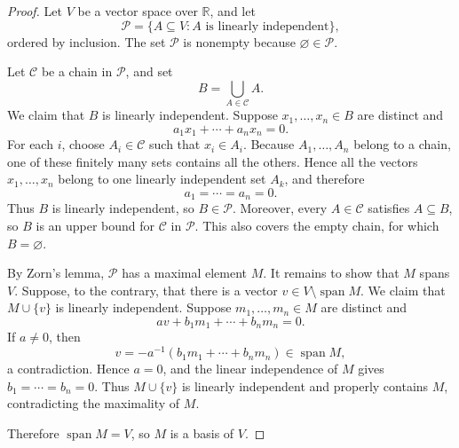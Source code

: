 \begin{proof}
Let $V$ be a vector space over $\mathbb{R}$, and let
\[
\mathcal{P}=\{A\subseteq V:A\text{ is linearly independent}\},
\]
ordered by inclusion. The set $\mathcal{P}$ is nonempty because
$\varnothing\in\mathcal{P}$.

Let $\mathcal{C}$ be a chain in $\mathcal{P}$, and set
\[
B=\bigcup_{A\in\mathcal{C}}A.
\]
We claim that $B$ is linearly independent. Suppose
$x_1,\ldots,x_n\in B$ are distinct and
\[
a_1x_1+\cdots+a_nx_n=0.
\]
For each $i$, choose $A_i\in\mathcal{C}$ such that $x_i\in A_i$. Because
$A_1,\ldots,A_n$ belong to a chain, one of these finitely many sets contains
all the others. Hence all the vectors $x_1,\ldots,x_n$ belong to one
linearly independent set $A_k$, and therefore
\[
a_1=\cdots=a_n=0.
\]
Thus $B$ is linearly independent, so $B\in\mathcal{P}$. Moreover, every
$A\in\mathcal{C}$ satisfies $A\subseteq B$, so $B$ is an upper bound for
$\mathcal{C}$ in $\mathcal{P}$. This also covers the empty chain, for which
$B=\varnothing$.

By Zorn's lemma, $\mathcal{P}$ has a maximal element $M$. It remains to show
that $M$ spans $V$. Suppose, to the contrary, that there is a vector
$v\in V\setminus\operatorname{span}M$. We claim that $M\cup\{v\}$ is
linearly independent. Suppose $m_1,\ldots,m_n\in M$ are distinct and
\[
av+b_1m_1+\cdots+b_nm_n=0.
\]
If $a\neq0$, then
\[
v=-a^{-1}(b_1m_1+\cdots+b_nm_n)\in\operatorname{span}M,
\]
a contradiction. Hence $a=0$, and the linear independence of $M$ gives
$b_1=\cdots=b_n=0$. Thus $M\cup\{v\}$ is linearly independent and properly
contains $M$, contradicting the maximality of $M$.

Therefore $\operatorname{span}M=V$, so $M$ is a basis of $V$.
\end{proof}